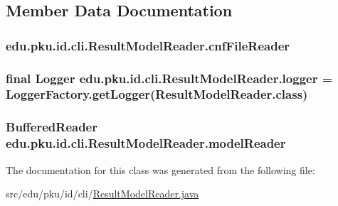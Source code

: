\subsection{Member Data Documentation}
\hypertarget{classedu_1_1pku_1_1id_1_1cli_1_1_result_model_reader_a187962842c15d8aa1f28cc70cfd2bc6a}{
\subsubsection[{cnfFileReader}]{ {\bf edu.pku.id.cli.ResultModelReader.cnfFileReader}}}
\label{classedu_1_1pku_1_1id_1_1cli_1_1_result_model_reader_a187962842c15d8aa1f28cc70cfd2bc6a}
\hypertarget{classedu_1_1pku_1_1id_1_1cli_1_1_result_model_reader_a500bdcf07a976b25e65bc5c7ddf3db55}{
\subsubsection[{logger}]{\setlength{\rightskip}{0pt plus 5cm}final Logger {\bf edu.pku.id.cli.ResultModelReader.logger} = LoggerFactory.getLogger(ResultModelReader.class)}}
\label{classedu_1_1pku_1_1id_1_1cli_1_1_result_model_reader_a500bdcf07a976b25e65bc5c7ddf3db55}
\hypertarget{classedu_1_1pku_1_1id_1_1cli_1_1_result_model_reader_ae26076ae9ffd55117eb4c135e68bbbd0}{
\subsubsection[{modelReader}]{\setlength{\rightskip}{0pt plus 5cm}BufferedReader {\bf edu.pku.id.cli.ResultModelReader.modelReader}}}
\label{classedu_1_1pku_1_1id_1_1cli_1_1_result_model_reader_ae26076ae9ffd55117eb4c135e68bbbd0}


The documentation for this class was generated from the following file:\begin{DoxyCompactItemize}
\item 
src/edu/pku/id/cli/\hyperlink{_result_model_reader_8java}{ResultModelReader.java}\end{DoxyCompactItemize}
